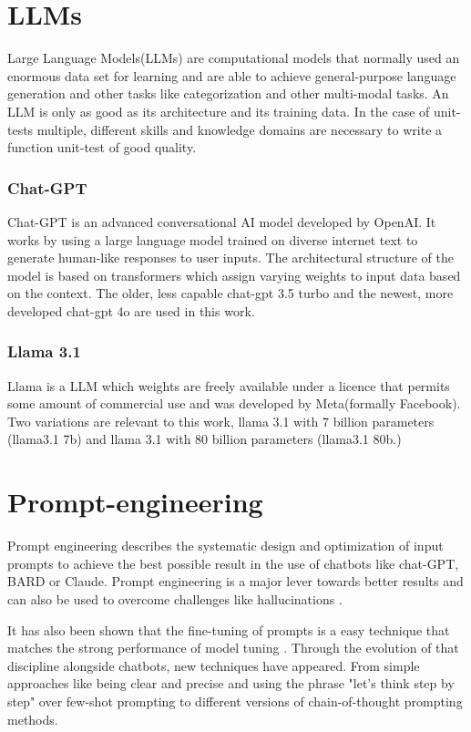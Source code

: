 \documentclass[a4paper,11pt,oneside]{memoir}
\begin{document}
\section{LLMs}
Large Language Models(LLMs) are computational models that normally used an enormous data set for learning and are able to achieve general-purpose language generation and other tasks like categorization and other multi-modal tasks. An LLM is only as good as its architecture and its training data. 
In the case of unit-tests multiple, different skills and knowledge domains are necessary to write a function unit-test of good quality.

\subsubsection{Chat-GPT}
Chat-GPT is an advanced conversational AI model developed by OpenAI. It works by using a large language model trained on diverse internet text to generate human-like responses to user inputs. The architectural structure of the model is based on transformers which assign varying weights to input data based on the context.
The older, less capable chat-gpt 3.5 turbo and the newest, more developed chat-gpt 4o are used in this work. 

\subsubsection{Llama 3.1}
Llama is a LLM which weights are freely available under a licence that permits some amount of commercial use and was developed by Meta(formally Facebook).
Two variations are relevant to this work, llama 3.1 with 7 billion parameters (llama3.1 7b) and llama 3.1 with 80 billion parameters (llama3.1 80b.)

\section{Prompt-engineering}
Prompt engineering describes the systematic design and optimization of input prompts to achieve the best possible result in the use of chatbots like chat-GPT, BARD or Claude. Prompt engineering is a major lever towards better results \cite{Citation needed} and can also be used to overcome challenges like hallucinations \cite{sato2024reducingHallucination}.

It has also been shown that the fine-tuning of prompts is a easy technique that matches the strong performance of model tuning \cite{lester2021promptsAreEfficient}.
Through the evolution of that discipline alongside chatbots, new techniques have appeared. From simple approaches like being clear and precise and using the phrase "let's think step by step" over few-shot prompting to different versions of chain-of-thought prompting methods\cite{chen2024promptengineering}. 
\end{document}
